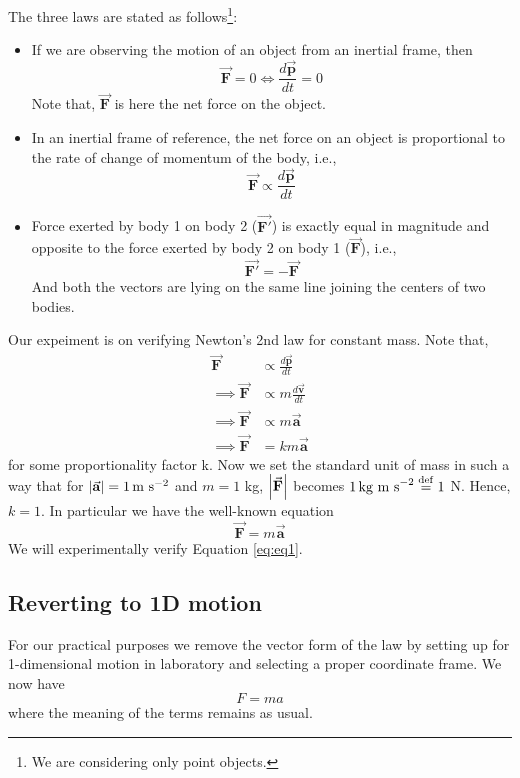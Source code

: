 \documentclass[11pt, a4paper, abstract=true]{scrartcl}
\newcommand{\ve}[1]{\vec{\mathbf{#1}}}
\newcommand{\dt}[1]{\frac{d#1}{dt}}
\begin{document}
\begin{theorem}
    The three laws are stated as follows\footnote{We are considering only point objects.}:
    \begin{itemize}
        \item If we are observing the motion of an object from an inertial frame, then \[\ve{F} = 0 \iff \dt{\ve{p}} = 0\] Note that, \(\ve{F}\) is here the net force on the object.
        \item In an inertial frame of reference, the net force on an object is proportional to the rate of change of momentum of the body, i.e., \[\ve{F} \propto \dt{\ve{p}}\]
        \item Force exerted by body 1 on body 2 (\(\ve{F'}\)) is exactly equal in magnitude and opposite to the force exerted by body 2 on body 1 (\(\ve{F}\)), i.e., \[\ve{F'} = -\ve{F}\] And both the vectors are lying on the same line joining the centers of two bodies.
    \end{itemize}
\end{theorem}
\begin{remark}
    Our expeiment is on verifying Newton's 2nd law for constant mass. Note that,
    \begin{align*}
        \ve{F} &\propto \dt{\ve{p}} \\ \implies \ve{F} &\propto m\dt{\ve{v}} \\ \implies \ve{F} &\propto m\ve{a} \\ \implies \ve{F} &= km\ve{a}
    \end{align*}
    for some proportionality factor k.
    Now we set the standard unit of mass in such a way that for \(\abs{\ve{a}} = 1 \, \text{m s}^{-2}\) and \(m = 1\) kg, \(\abs{\ve{F}}\) becomes \(1 \, \text{kg m s}^{-2} \overset{\mathrm{def}}{=} 1\) N. Hence, \(k = 1\). In particular we have the well-known equation
    \begin{equation}
        \ve{F} = m\ve{a}
        \label{eq:eq1}
    \end{equation}
    We will experimentally verify Equation \ref{eq:eq1}.
\end{remark}

\subsection{Reverting to 1D motion }
For our practical purposes we remove the vector form of the law by setting up for 1-dimensional motion in laboratory and selecting a proper coordinate frame. We now have 
\begin{equation}
    F = ma
    \label{eq:eq2}
\end{equation} where the meaning of the terms remains as usual.
\end{document}

